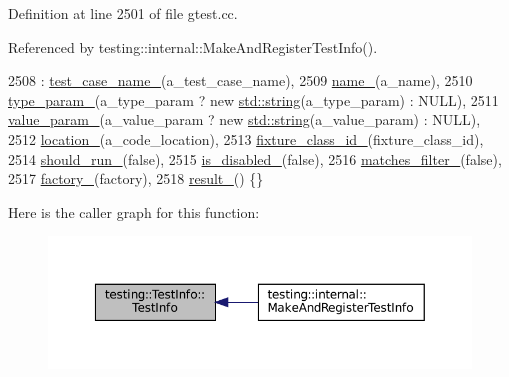 Definition at line 2501 of file gtest.\+cc.



Referenced by testing\+::internal\+::\+Make\+And\+Register\+Test\+Info().


\begin{DoxyCode}
2508     : \hyperlink{classtesting_1_1TestInfo_a3dcf626bbfc3756103be329c05377a5f}{test\_case\_name\_}(a\_test\_case\_name),
2509       \hyperlink{classtesting_1_1TestInfo_a6bed52b7c3d66c8c5eac5fa2aaadba55}{name\_}(a\_name),
2510       \hyperlink{classtesting_1_1TestInfo_ab4f53cfaf59e1b5cac858a9322697e88}{type\_param\_}(a\_type\_param ? \textcolor{keyword}{new} \hyperlink{namespacetesting_1_1internal_a8e8ff5b11e64078831112677156cb111}{std::string}(a\_type\_param) : NULL),
2511       \hyperlink{classtesting_1_1TestInfo_ac3dd68ea96ebe82c6eab31e6e730a918}{value\_param\_}(a\_value\_param ? \textcolor{keyword}{new} \hyperlink{namespacetesting_1_1internal_a8e8ff5b11e64078831112677156cb111}{std::string}(a\_value\_param) : NULL),
2512       \hyperlink{classtesting_1_1TestInfo_a749494420174e6cf1949c7b411e8df6f}{location\_}(a\_code\_location),
2513       \hyperlink{classtesting_1_1TestInfo_ad3284b7b9ebe61cc31440694091450ae}{fixture\_class\_id\_}(fixture\_class\_id),
2514       \hyperlink{classtesting_1_1TestInfo_a89c3d8fb8b565532c34d3123240fd5cf}{should\_run\_}(\textcolor{keyword}{false}),
2515       \hyperlink{classtesting_1_1TestInfo_af3765fc4f811296e0699b0a26430a7c7}{is\_disabled\_}(\textcolor{keyword}{false}),
2516       \hyperlink{classtesting_1_1TestInfo_a397686f82b6dd68a209ab7b50eeb4932}{matches\_filter\_}(\textcolor{keyword}{false}),
2517       \hyperlink{classtesting_1_1TestInfo_a6bf2422602b877c73f6eb169a63cfea8}{factory\_}(factory),
2518       \hyperlink{classtesting_1_1TestInfo_a108fd469897a8d4e5c4361947a5ed785}{result\_}() \{\}
\end{DoxyCode}
Here is the caller graph for this function\+:
\nopagebreak
\begin{figure}[H]
\begin{center}
\leavevmode
\includegraphics[width=350pt]{classtesting_1_1TestInfo_afc4a66e2d2491f09e8549c71514c3d78_icgraph}
\end{center}
\end{figure}


